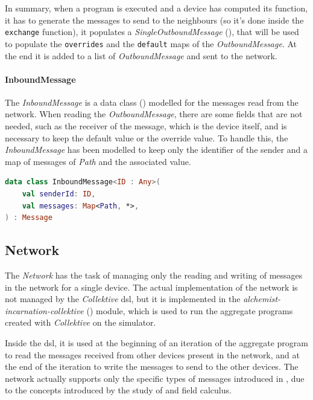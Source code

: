 In summary, when a program is executed and a device has computed its function, it has to generate the messages to send to
the neighbours (so it's done inside the \texttt{exchange} function), it populates a \emph{SingleOutboundMessage} (),
that will be used to populate the \texttt{overrides} and the \texttt{default} maps of the \emph{OutboundMessage}.
At the end it is added to a list of \emph{OutboundMessage} and sent to the network.

\paragraph{InboundMessage}
The \emph{InboundMessage} is a data class () modelled for the messages read from the network.
When reading the \emph{OutboundMessage}, there are some fields that are not needed, such as the receiver of the message,
which is the device itself, and is necessary to keep the default value or the override value.
To handle this, the \emph{InboundMessage} has been modelled to keep only the identifier of the sender and
a map of messages of \emph{Path} and the associated value.

\begin{lstlisting}[language=kt,label={lst:inbound}, caption={Inbound message data class.}]
data class InboundMessage<ID : Any>(
    val senderId: ID,
    val messages: Map<Path, *>,
) : Message
\end{lstlisting}

\subsection{Network}
\label{subsec:network}
The \emph{Network} has the task of managing only the reading and writing of messages in the network for a single device.
The actual implementation of the network is not managed by the \emph{Collektive} \ac{dsl}, but it is implemented in the
\emph{alchemist-incarnation-collektive} () module, which is used to run the aggregate programs created with \emph{Collektive} on the simulator.

Inside the \ac{dsl}, it is used at the beginning of an iteration of the aggregate program to read the messages received from
other devices present in the network, and at the end of the iteration to write the messages to send to the other devices.
The network actually supports only the specific types of messages introduced in , due to the
concepts introduced by the study of \xc{} and field calculus.

